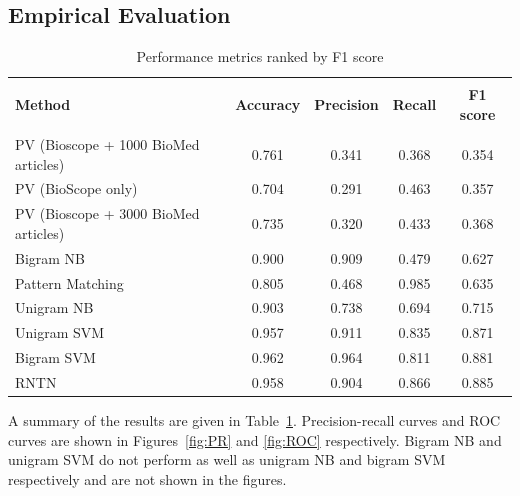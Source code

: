 \documentclass{article}
\begin{document}
\subsection{Empirical Evaluation}
\begin{table}
\caption{Performance metrics ranked by F1 score}
\centering
\begin{tabular}{|l c c c c|}
\hline
&&&&\\
\textbf{Method} & \textbf{Accuracy} & \textbf{Precision} & \textbf{Recall} & \textbf{F1 score} \\
\hline
&&&& \\
PV (Bioscope + 1000 BioMed articles) & 0.761 & 0.341 & 0.368 & 0.354 \\
PV (BioScope only) & 0.704 & 0.291 & 0.463 & 0.357 \\
PV (Bioscope + 3000 BioMed articles) & 0.735 & 0.320 & 0.433 & 0.368 \\
Bigram NB & 0.900 & 0.909 & 0.479 & 0.627 \\
Pattern Matching & 0.805 & 0.468 & 0.985 & 0.635 \\
Unigram NB & 0.903 & 0.738 & 0.694 & 0.715 \\
Unigram SVM & 0.957 & 0.911 & 0.835 & 0.871 \\
Bigram SVM & 0.962 & 0.964 & 0.811 & 0.881 \\
RNTN & 0.958 & 0.904 & 0.866 & 0.885 \\
\hline
\end{tabular}
\label{table:F1score}
\end{table}



%
%
A summary of the results are given in Table~\ref{table:F1score}. Precision-recall curves and ROC curves are shown in Figures~\ref{fig:PR} and \ref{fig:ROC} respectively. Bigram NB and unigram SVM do not perform as well as unigram NB and bigram SVM respectively and are not shown in the figures.
\end{document}

